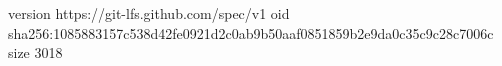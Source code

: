 version https://git-lfs.github.com/spec/v1
oid sha256:1085883157c538d42fe0921d2c0ab9b50aaf0851859b2e9da0c35c9c28c7006c
size 3018

